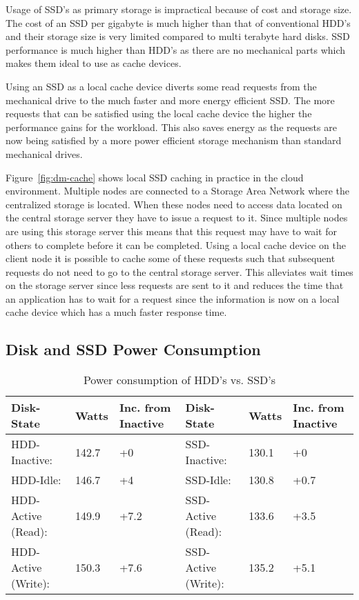 Usage of SSD's as primary storage is impractical because of cost and storage
size. The cost of an SSD per gigabyte is much higher than that of conventional
HDD's and their storage size is very limited compared to multi terabyte hard
disks. SSD performance is much higher than HDD's as there are no mechanical
parts which makes them ideal to use as cache devices.

Using an SSD as a local cache device diverts some read requests from the
mechanical drive to the much faster and more energy efficient SSD. The more
requests that can be satisfied using the local cache device the higher the
performance gains for the workload. This also saves energy as the requests are
now being satisfied by a more power efficient storage mechanism than standard
mechanical drives.

Figure~\ref{fig:dm-cache} shows local SSD caching in practice in the cloud
environment. Multiple nodes are connected to a Storage Area Network where the
centralized storage is located. When these nodes need to access data located on
the central storage server they have to issue a request to it. Since multiple
nodes are using this storage server this means that this request may have to
wait for others to complete before it can be completed. Using a local cache
device on the client node it is possible to cache some of these requests such
that subsequent requests do not need to go to the central storage server. This
alleviates wait times on the storage server since less requests are sent to it
and reduces the time that an application has to wait for a request since the
information is now on a local cache device which has a much faster response
time.

\subsection{Disk and SSD Power Consumption}

\begin{table}[t]
  \centering
  \resizebox{\linewidth}{!}
  {
    \begin{tabular}{|l|l|l|l|l|l|}
      \hline
      \bf Disk-State & \bf Watts & \bf Inc. from Inactive & \bf Disk-State & \bf
      Watts & \bf Inc. from Inactive \\ \hline
      HDD-Inactive:       & 142.7 & +0   & SSD-Inactive:       & 130.1 & +0   \\
      \hline
      HDD-Idle:           & 146.7 & +4   & SSD-Idle:           & 130.8 & +0.7 \\
      \hline
      HDD-Active (Read):  & 149.9 & +7.2 & SSD-Active (Read):  & 133.6 & +3.5 \\
      \hline
      HDD-Active (Write): & 150.3 & +7.6 & SSD-Active (Write): & 135.2 & +5.1 \\
      \hline
    \end{tabular}
  }
  \caption{Power consumption of HDD's vs. SSD's}
  \label{tab:power-consumption}
\end{table}

